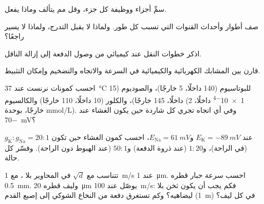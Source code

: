 \begin{exercise}[$\star$]\label{exo:b2:neurons-synapses:1}
سمِّ أجزاء  ووظيفة كل جزء، وقل مم
يتألف  وماذا يفعل.
\end{exercise}

\begin{exercise}[$\star$]\label{exo:b2:neurons-synapses:2}
صف أطوار  وأحداث القنوات
التي تسبب كل طور. ولماذا لا يقبل التدرج، ولماذا لا يسير
راجعًا؟
\end{exercise}

\begin{exercise}[$\star$]\label{exo:b2:neurons-synapses:3}
اذكر خطوات النقل عند  كيميائي من
وصول الدفعة إلى إزالة الناقل.
\end{exercise}

\begin{exercise}[$\star$]\label{exo:b2:neurons-synapses:4}
قارن بين المشابك الكهربائية والكيميائية في السرعة والاتجاه
والتضخيم وإمكان التثبيط.
\end{exercise}

\begin{exercise}[$\star\star$]\label{exo:b2:neurons-synapses:5}
احسب كمونات نرنست عند \qty{37}{\celsius} للبوتاسيوم
(140 داخلًا، 5 خارجًا)، والصوديوم (15 داخلًا، 145 خارجًا)، والكلور (10 داخلًا، 110 خارجًا)
والكالسيوم (\qty{1e-4}{} داخلًا، 2 خارجًا، بوحدة \unit{mmol/L}). وفي أي اتجاه
تجري كل شاردة حين يكون الغشاء عند \qty{-70}{mV}؟
\end{exercise}

\begin{exercise}[$\star\star$]\label{exo:b2:neurons-synapses:6}
عند $E_{\mathrm K} = \qty{-89}{mV}$ و$E_{\mathrm{Na}} =
\qty{+61}{mV}$، احسب كمون الغشاء حين تكون $g_{\mathrm K} :
g_{\mathrm{Na}} = 20 : 1$ (في الراحة)، و$1 : 20$ (عند ذروة الدفعة)
و$50 : 1$ (عند الهبوط دون الراحة). وفسّر كل حالة.
\end{exercise}

\begin{exercise}[$\star\star$]\label{exo:b2:neurons-synapses:7}
تتناسب  مع $\sqrt d$ في المحاوير بلا ، مع
\qty{1}{m/s} عند \qty{1}{\micro m}. احسب سرعة  حبار
قطره \qty{0.5}{mm}. وليف  قطره \qty{20}{\micro m}
يوصّل عند \qty{100}{m/s}: فكم يجب أن يكون ثخن  بلا 
ليضاهيه؟ وكم تستغرق دفعة من النخاع
الشوكي إلى إصبع القدم (\qty{1}{m}) في كل ليف؟
\end{exercise}


